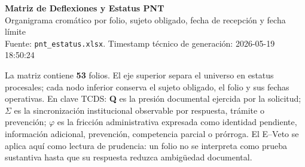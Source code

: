 \documentclass[10pt,letterpaper]{article}
\newcommand{\tstamp}{2026-05-19 18:50:24}
\begin{document}
\begin{center}
{\LARGE\bfseries Matriz de Deflexiones y Estatus PNT}\\[3pt]
{\large Organigrama cromático por folio, sujeto obligado, fecha de recepción y fecha límite}\\[4pt]
{\small Fuente: \texttt{pnt\_estatus.xlsx}. Timestamp técnico de generación: \tstamp}
\end{center}

\begin{tcolorbox}[colback=AzulFederal!6,colframe=AzulFederal,title={Lectura ejecutiva del mapa},fonttitle=\bfseries]
La matriz contiene \textbf{53} folios. El eje superior separa el universo en estatus procesales; cada nodo inferior conserva el sujeto obligado, el folio y sus fechas operativas. En clave TCDS: \textbf{Q} es la presión documental ejercida por la solicitud; \textbf{$\Sigma$} es la sincronización institucional observable por respuesta, trámite o prevención; \textbf{$\varphi$} es la fricción administrativa expresada como identidad pendiente, información adicional, prevención, competencia parcial o prórroga. El E--Veto se aplica aquí como lectura de prudencia: un folio no se interpreta como prueba sustantiva hasta que su respuesta reduzca ambigüedad documental.
\end{tcolorbox}
\end{document}
